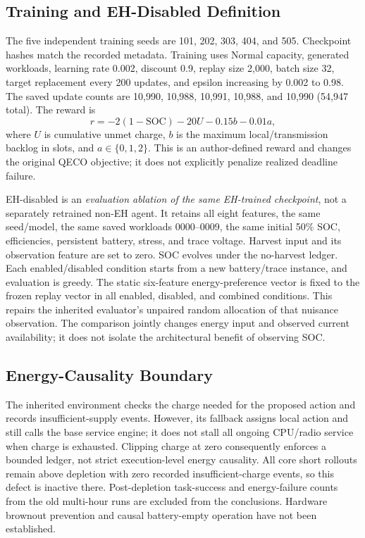 \documentclass[conference]{IEEEtran}
\begin{document}
\subsection{Training and EH-Disabled Definition}
The five independent training seeds are 101, 202, 303, 404, and 505. Checkpoint hashes match the recorded metadata. Training uses Normal capacity, generated workloads, learning rate 0.002, discount 0.9, replay size 2,000, batch size 32, target replacement every 200 updates, and epsilon increasing by 0.002 to 0.98. The saved update counts are 10,990, 10,988, 10,991, 10,988, and 10,990 (54,947 total). The reward is
\begin{equation}
r=-2(1-\mathrm{SOC})-20U-0.15b-0.01a,
\label{eq:reward}
\end{equation}
where $U$ is cumulative unmet charge, $b$ is the maximum local/transmission backlog in slots, and $a\in\{0,1,2\}$. This is an author-defined reward and changes the original QECO objective; it does not explicitly penalize realized deadline failure.

EH-disabled is an \emph{evaluation ablation of the same EH-trained checkpoint}, not a separately retrained non-EH agent. It retains all eight features, the same seed/model, the same saved workloads 0000--0009, the same initial 50\% SOC, efficiencies, persistent battery, stress, and trace voltage. Harvest input and its observation feature are set to zero. SOC evolves under the no-harvest ledger. Each enabled/disabled condition starts from a new battery/trace instance, and evaluation is greedy. The static six-feature energy-preference vector is fixed to the frozen replay vector in all enabled, disabled, and combined conditions. This repairs the inherited evaluator's unpaired random allocation of that nuisance observation. The comparison jointly changes energy input and observed current availability; it does not isolate the architectural benefit of observing SOC.

\subsection{Energy-Causality Boundary}
The inherited environment checks the charge needed for the proposed action and records insufficient-supply events. However, its fallback assigns local action and still calls the base service engine; it does not stall all ongoing CPU/radio service when charge is exhausted. Clipping charge at zero consequently enforces a bounded ledger, not strict execution-level energy causality. All core short rollouts remain above depletion with zero recorded insufficient-charge events, so this defect is inactive there. Post-depletion task-success and energy-failure counts from the old multi-hour runs are excluded from the conclusions. Hardware brownout prevention and causal battery-empty operation have not been established.
\end{document}
